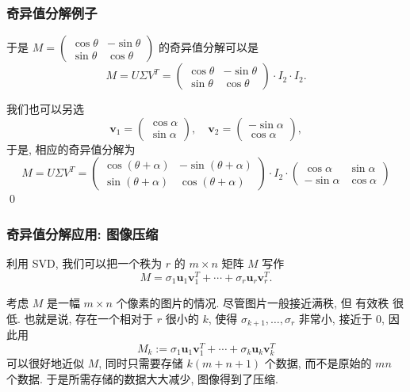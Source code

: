 \begin{frame}
\frametitle{奇异值分解例子}

于是 $M = \begin{pmatrix} \cos\theta & -\sin\theta \\ \sin\theta & \cos\theta \end{pmatrix}$ 的奇异值分解可以是
\[M = U\Sigma V^T = \begin{pmatrix} \cos\theta & -\sin\theta \\ \sin\theta & \cos\theta \end{pmatrix} \cdot I_2 \cdot I_2.\]

\vspace{1em}
\pause

我们也可以另选
\[\mathbf{v}_1 = \begin{pmatrix} \cos\alpha \\ \sin\alpha \end{pmatrix}, \quad \mathbf{v}_2 = \begin{pmatrix} -\sin\alpha \\ \cos\alpha \end{pmatrix},\]
于是, 相应的奇异值分解为
\[M = U\Sigma V^T = \begin{pmatrix} \cos(\theta+\alpha) & -\sin(\theta+\alpha) \\ \sin(\theta+\alpha) & \cos(\theta+\alpha) \end{pmatrix} \cdot I_2 \cdot \begin{pmatrix} \cos\alpha & \sin\alpha \\ -\sin\alpha & \cos\alpha \end{pmatrix}\]
\qed

\end{frame}


\begin{frame}
\frametitle{奇异值分解应用: 图像压缩}

利用 SVD, 我们可以把一个秩为 $r$ 的 $m\times n$ 矩阵 $M$ 写作
\[M = \sigma_1\mathbf{u}_1\mathbf{v}_1^T + \cdots + \sigma_r\mathbf{u}_r\mathbf{v}_r^T.\]

考虑 $M$ 是一幅 $m\times n$ 个像素的图片的情况. 尽管图片一般接近满秩, 但 {\color{red}有效秩} 很低. 也就是说, 存在一个相对于 $r$ 很小的 $k$, 使得 $\sigma_{k+1},\ldots,\sigma_{r}$ 非常小, 接近于 $0$, 因此用
\[M_k := \sigma_1\mathbf{u}_1\mathbf{v}_1^T + \cdots + \sigma_k\mathbf{u}_k\mathbf{v}_k^T\]
可以很好地近似 $M$, 同时只需要存储 $k(m+n+1)$ 个数据, 而不是原始的 $mn$ 个数据. 于是所需存储的数据大大减少, 图像得到了压缩.

\end{frame}


